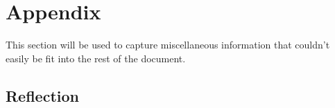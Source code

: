 \documentclass[12pt]{article}
\begin{document}
\section{Appendix}
This section will be used to capture miscellaneous information that couldn't easily be fit into the rest of the document.  

\subsection{Reflection}



\end{document}
